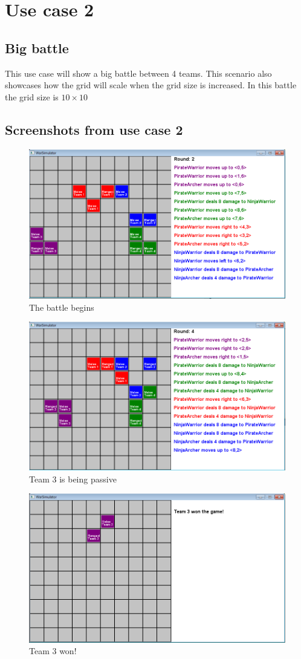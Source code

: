 \section{Use case 2}
	\subsection*{Big battle}
	This use case will show a big battle between 4 teams. This scenario also showcases how the grid will scale when the 
	grid size is increased. In this battle the grid size is $10 \times 10$
	
	\subsection*{Screenshots from use case 2}
		\begin{figure}[H]
			\center
			\includegraphics[scale=0.6]{rapport/7/figures/case2-1.png}
			\caption{The battle begins}
		\end{figure}
		\begin{figure}[H]
		\center
			\includegraphics[scale=0.6]{rapport/7/figures/case2-2.png}
			\caption{Team 3 is being passive}
		\end{figure}
		\begin{figure}[H]
		\center
			\includegraphics[scale=0.6]{rapport/7/figures/case2-3.png}
			\caption{Team 3 won!}
		\end{figure}